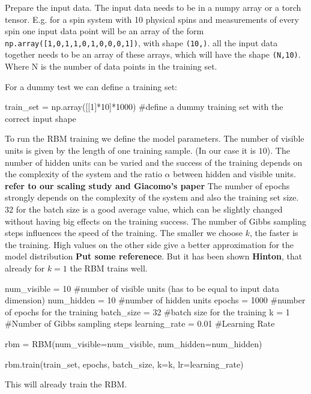 \documentclass[submission, Phys]{SciPost}
\begin{document}
Prepare the input data. The input data needs to be in a numpy array or a torch tensor. E.g. for a spin system with 10 physical spins and measurements of every spin one input data point will be an array of the form \verb|np.array([1,0,1,1,0,1,0,0,0,1])|, with shape \verb|(10,)|. all the input data together needs to be an array of these arrays, which will have the shape \verb|(N,10)|. Where N is the number of data points in the training set.

For a dummy test we can define a training set:

\begin{python}
train_set = np.array([[1]*10]*1000) #define a dummy training set with the correct input shape
\end{python}

To run the RBM training we define the model parameters. The number of visible units is given by the length of one training sample. (In our case it is $10$). 
The number of hidden units can be varied and the success of the training depends on the complexity of the system and the ratio $\alpha$ between hidden and visible units. 
\textbf{refer to our scaling study and Giacomo's paper} 
The number of epochs strongly depends on the complexity of the system and also the training set size. 32 for the batch size is a good average value, which can be slightly changed without having big effects on the training success. The number of Gibbs sampling steps influences the speed of the training. The smaller we choose $k$, the faster is the training. High values on the other side give a better approximation for the model distribution \textbf{Put some referenece}. But it has been shown \textbf{Hinton}, that already for $k=1$ the RBM trains well.

\begin{python}
num_visible = 10 #number of visible units (has to be equal to input data dimension)
num_hidden = 10 #number of hidden units
epochs = 1000 #number of epochs for the training
batch_size = 32 #batch size for the training
k = 1 #Number of Gibbs sampling steps
learning_rate = 0.01 #Learning Rate
\end{python}



\begin{python}
rbm = RBM(num_visible=num_visible, num_hidden=num_hidden)

rbm.train(train_set, epochs, batch_size, k=k, lr=learning_rate)
\end{python}

This will already train the RBM.
\end{document}
